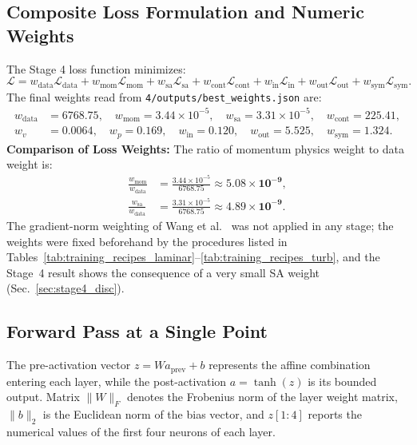 \documentclass[11pt,a4paper]{article}
\begin{document}
\subsection{Composite Loss Formulation and Numeric Weights}
The Stage 4 loss function minimizes:
\begin{equation}
\mathcal{L} = w_{\mathrm{data}}\mathcal{L}_{\mathrm{data}} + w_{\mathrm{mom}}\mathcal{L}_{\mathrm{mom}} + w_{\mathrm{sa}}\mathcal{L}_{\mathrm{sa}} + w_{\mathrm{cont}}\mathcal{L}_{\mathrm{cont}} + w_{\mathrm{in}}\mathcal{L}_{\mathrm{in}} + w_{\mathrm{out}}\mathcal{L}_{\mathrm{out}} + w_{\mathrm{sym}}\mathcal{L}_{\mathrm{sym}}.
\end{equation}
The final weights read from \texttt{4/outputs/best\_weights.json} are:
\begin{align}
w_{\mathrm{data}} &= 6768.75, \quad w_{\mathrm{mom}} = 3.44\times 10^{-5}, \quad w_{\mathrm{sa}} = 3.31\times 10^{-5}, \quad w_{\mathrm{cont}} = 225.41, \\
w_{v} &= 0.0064, \quad w_{p} = 0.169, \quad w_{\mathrm{in}} = 0.120, \quad w_{\mathrm{out}} = 5.525, \quad w_{\mathrm{sym}} = 1.324.
\end{align}
\noindent\textbf{Comparison of Loss Weights:} The ratio of momentum physics weight to data weight is:
\begin{align}
\frac{w_{\mathrm{mom}}}{w_{\mathrm{data}}} &= \frac{3.44\times 10^{-5}}{6768.75} \approx \mathbf{5.08\times 10^{-9}}, \\
\frac{w_{\mathrm{sa}}}{w_{\mathrm{data}}} &= \frac{3.31\times 10^{-5}}{6768.75} \approx \mathbf{4.89\times 10^{-9}}.
\end{align}
The gradient-norm weighting of Wang et al.~\cite[Alg.~1, p.~10]{wang2021} was not applied in any stage; the weights were fixed beforehand by the procedures listed in Tables~\ref{tab:training_recipes_laminar}--\ref{tab:training_recipes_turb}, and the Stage~4 result shows the consequence of a very small SA weight (Sec.~\ref{sec:stage4_disc}).

\subsection{Forward Pass at a Single Point}
The pre-activation vector $z = W a_{\mathrm{prev}} + b$ represents the affine combination entering each layer, while the post-activation $a = \tanh(z)$ is its bounded output. Matrix $\|W\|_F$ denotes the Frobenius norm of the layer weight matrix, $\|b\|_2$ is the Euclidean norm of the bias vector, and $z[1:4]$ reports the numerical values of the first four neurons of each layer.
\end{document}

